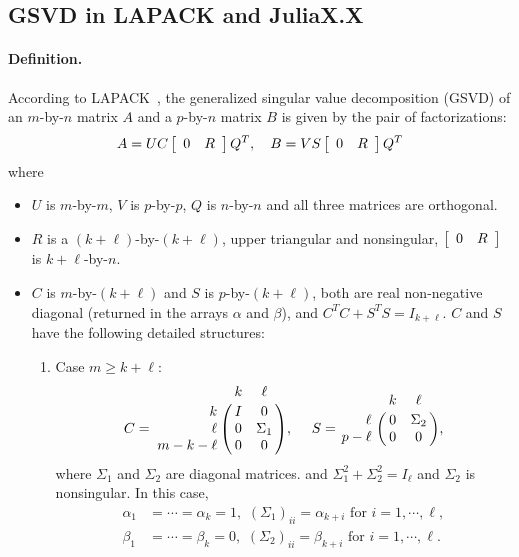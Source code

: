 \subsection{GSVD in LAPACK and JuliaX.X} \label{def}
\paragraph{Definition.} 
According to LAPACK~\cite[pp.~23--24]{anderson1999lapack},
the generalized singular value decomposition (GSVD) 
of an $m$-by-$n$ matrix $A$ and a $p$-by-$n$ matrix $B$ is given by 
the pair of factorizations: 
\begin{align} \label{eq:gsvdbylapack}
A = UC\left[ \begin{array}{cc} 0 & R \end{array} \right]Q^T, \quad B = VS\left[ \begin{array}{cc} 0 & R \end{array} \right]Q^T
\end{align}
where 
\begin{itemize}
\item $U$ is $m$-by-$m$, $V$ is $p$-by-$p$, 
$Q$ is $n$-by-$n$ and all three matrices are orthogonal.

\item $R$ is a $(k+\ell)$-by-$(k+\ell)$, upper triangular and 
nonsingular, $\left[ \begin{array}{cc} 0 & R \end{array} \right]$ is $k+\ell$-by-$n$. 

\item $C$ is $m$-by-$(k+\ell)$ and $S$ is $p$-by-$(k+\ell)$, 
both are real non-negative diagonal (returned
in the arrays $\alpha$ and $\beta$), 
and $C^T C + S^T S = I_{k+\ell}$.  
$C$ and $S$ have the following detailed structures: 
\begin{enumerate}[\hspace{2em}(1)]
\item Case $m \ge k+\ell$: 
\[
                    C = \bordermatrix{ & k & \ell  \cr
                    \hfill k & I & 0 \cr
                    \hfill \ell & 0 & \Sigma_1 \cr
                    m-k-\ell & 0 & 0}, \  \ \ \
                    S = \bordermatrix{ & k & \ell \cr
                    \hfill \ell & 0 & \Sigma_2 \cr
                    \hfill p-\ell & 0 & 0},
\]
where $\Sigma_1$ and $\Sigma_2$ are diagonal matrices. 
and $\Sigma_1^2 + \Sigma_2^2 = I_{\ell}$ and $\Sigma_2$ is nonsingular. 
In this case, 
\begin{align*} 
\alpha_1 & =  \cdots = \alpha_k = 1, \,\,
  (\Sigma_1)_{ii} = \alpha_{k+i}\,\, \mbox{for $i = 1, \cdots, \ell$}, \\  
\beta_1  & = \cdots = \beta_k = 0, \,\,  
  (\Sigma_2)_{ii} = \beta_{k+i}\,\, \mbox{for $i = 1, \cdots, \ell$}.
\end{align*} 


\end{enumerate}
\end{itemize}
